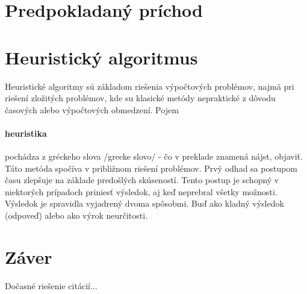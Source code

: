 \documentclass[10pt,twoside,slovak,a4paper]{article}
\begin{document}
\section{Predpokladaný príchod}
\section{Heuristický algoritmus} \label{heuristika}
Heuristické algoritmy sú základom riešenia výpočtových problémov, najmä pri riešení zložitých problémov, kde su klasické metódy nepraktické z dôvodu časových alebo výpočtových obmedzení.
Pojem \paragraph{heuristika} pochádza z gréckeho slova /grecke slovo/ - čo v preklade znamená nájst, objaviť. Táto metóda spočíva v približnom riešení problémov. Prvý odhad sa postupom času zlepšuje na základe predošlých skúseností. Tento postup je schopný v niektorých prípadoch priniesť výsledok, aj keď neprebral všetky možnosti. Výsledok je spravidla vyjadrený dvoma spôsobmi. Buď ako kladný výsledok (odpoveď) alebo ako výrok neurčitosti. 



\section{Záver} \label{zaver} %
\cite{Heuristika}
\cite{AI-and-traffic}
\cite{Djikstra's}
\cite{Algoritmy}
\cite{Heuristika2}
\cite{Algoritmy2}

Dočasné riešenie citácií...





\end{document}
